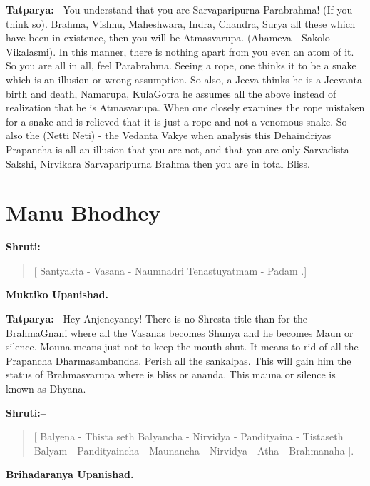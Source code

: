 \textbf{Tatparya:–} You understand that you are Sarvaparipurna Parabrahma! (If you think so). Brahma, Vishnu, Maheshwara, Indra, Chandra, Surya all these which have been in existence, then you will be Atmasvarupa. (Ahameva - Sakolo - Vikalasmi). In this manner, there is nothing apart from you even an atom of it. So you are all in all, feel Parabrahma. Seeing a rope, one thinks it to be a snake which is an illusion or wrong assumption. So also, a Jeeva thinks he is a Jeevanta birth and death, Namarupa, KulaGotra he assumes all the above instead of realization that he is Atmasvarupa. When one closely examines the rope mistaken for a snake and is relieved that it is just a rope and not a venomous snake. So also the (Netti Neti) - the Vedanta Vakye when analysis this Dehaindriyas Prapancha is all an illusion that you are not, and that you are only Sarvadista Sakshi, Nirvikara Sarvaparipurna Brahma then you are in total Bliss.

\chapter{Manu Bhodhey}

\textbf{Shruti:–}

\begin{verse}
[ Santyakta - Vasana - Naumnadri Tenastuyatmam - Padam .]
\end{verse}

\begin{flushright}
\textbf{Muktiko Upanishad.}
\end{flushright}

\textbf{Tatparya:–} Hey Anjeneyaney! There is no Shresta title than for the BrahmaGnani where all the Vasanas becomes Shunya and he becomes Maun or silence. Mouna means just not to keep the mouth shut. It means to rid of all the Prapancha Dharmasambandas. Perish all the sankalpas. This will gain him the status of Brahmasvarupa where is bliss or ananda. This mauna or silence is known as Dhyana.

\textbf{Shruti:–}

\begin{verse}
[ Balyena - Thista seth  Balyancha - Nirvidya - Pandityaina - Tistaseth  Balyam - Pandityaincha - Maunancha - Nirvidya - Atha - Brahmanaha ].
\end{verse}

\begin{flushright}
\textbf{Brihadaranya Upanishad.}
\end{flushright}

